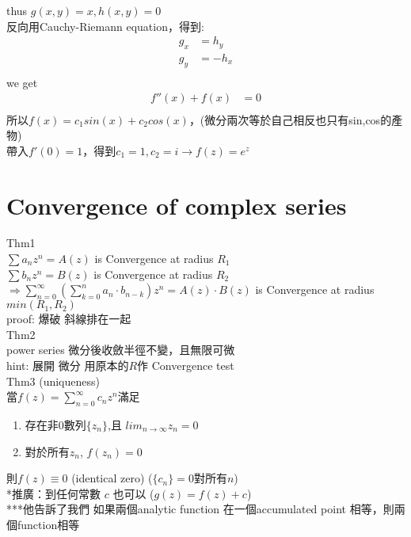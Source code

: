 \documentclass{article}
\begin{document}
thus $g(x,y)=x, h(x,y)=0$\\

反向用Cauchy-Riemann equation，得到:\\

\begin{align*}
g_{x} &= h_{y} \\
g_{y} &= -h_{x} \\
\end{align*}
we get
\begin{align*}
    f''(x) + f(x) &= 0 \\
\end{align*}
所以$f(x) = c_1sin(x) + c_2cos(x)$，(微分兩次等於自己相反也只有sin,cos的產物)\\
帶入$f'(0) = 1$，得到$c_1 = 1, c_2 = i\longrightarrow f(z) = e^{z}$\\

\section{Convergence of complex series}
Thm1\\
$\sum a_{n} z^{n}=A(z)$ is Convergence at radius $R_{1}$\\
$\sum b_{n} z^{n}=B(z)$ is Convergence at radius $R_{2}$\\
$\Rightarrow \sum_{n=0}^{\infty} (\sum_{k=0}^{n} a_{n}\cdot b_{n-k}) z^{n} =A(z) \cdot B(z)$ is Convergence at radius $min(R_{1},R_{2})$\\
proof: 爆破 斜線排在一起 \\

Thm2\\
power series 微分後收斂半徑不變，且無限可微\\
hint: 展開 微分 用原本的$R$作 Convergence test\\

Thm3 (uniqueness)\\
當$f(z)=\sum_{n=0}^{\infty} c_{n} z^{n}$滿足
\begin{enumerate}
    \item 存在非0數列$\{z_{n}\}$,且 $lim_{n \to \infty} z_{n} = 0$\\
    \item 對於所有$z_{n}$, $f(z_{n}) = 0$\\
\end{enumerate}
則$f(z) \equiv 0$ (identical zero)  ($\{c_{n}\}=0$對所有$n$)\\
*推廣：到任何常數 $c$ 也可以 ($g(z)=f(z)+c$)\\
***他告訴了我們 如果兩個analytic function 在一個accumulated point 相等，則兩個function相等\\
\end{document}
